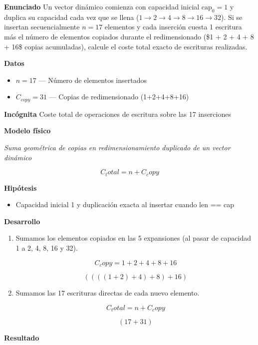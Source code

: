 \documentclass{book}
\begin{document}
\begin{tcolorbox}[title={Problema resuelto}, studiumworked, breakable]

\noindent\textbf{Enunciado}
Un vector dinámico comienza con capacidad inicial \(\text{cap}_0 = 1\) y duplica su capacidad cada vez que se llena (\(1 \to 2 \to 4 \to 8 \to 16 \to 32\)). Si se insertan secuencialmente \(n = 17\) elementos y cada inserción cuesta 1 escritura más el número de elementos copiados durante el redimensionado (\$1 + 2 + 4 + 8 + 16\$ copias acumuladas), calcule el coste total exacto de escrituras realizadas.

\noindent\textbf{Datos}
\begin{itemize}
\item $n = 17$ — Número de elementos insertados
\item $C_{copy} = 31$ — Copias de redimensionado (1+2+4+8+16)
\end{itemize}

\noindent\textbf{Incógnita}
Coste total de operaciones de escritura sobre las 17 inserciones

\noindent\textbf{Modelo físico}

\noindent\textit{Suma geométrica de copias en redimensionamiento duplicado de un vector dinámico}

\[
C_total = n + C_copy
\]

\noindent\textbf{Hipótesis}
\begin{itemize}
\item Capacidad inicial 1 y duplicación exacta al insertar cuando len == cap
\end{itemize}

\noindent\textbf{Desarrollo}
\begin{enumerate}
\item
Sumamos los elementos copiados en las 5 expansiones (al pasar de capacidad 1 a 2, 4, 8, 16 y 32).

\[
C_copy = 1 + 2 + 4 + 8 + 16
\]

\[
\left(\left(\left(\left(1+2\right)+4\right)+8\right)+16\right)
\]
\item
Sumamos las 17 escrituras directas de cada nuevo elemento.

\[
C_total = n + C_copy
\]

\[
\left(17+31\right)
\]
\end{enumerate}

\noindent\textbf{Resultado}


\end{tcolorbox}
\end{document}
